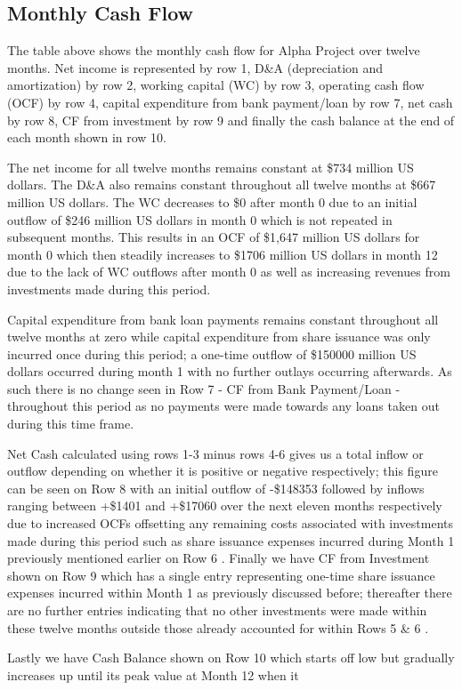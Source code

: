 

\subsection{Monthly Cash Flow}\label{sec:title}

The table above shows the monthly cash flow for Alpha Project over twelve months. Net income is represented by row 1, D&A (depreciation and amortization) by row 2, working capital (WC) by row 3, operating cash flow (OCF) by row 4, capital expenditure from bank payment/loan by row 7, net cash by row 8, CF from investment by row 9 and finally the cash balance at the end of each month shown in row 10.  

The net income for all twelve months remains constant at \$734 million US dollars. The D&A also remains constant throughout all twelve months at \$667 million US dollars. The WC decreases to \$0 after month 0 due to an initial outflow of \$246 million US dollars in month 0 which is not repeated in subsequent months. This results in an OCF of \$1,647 million US dollars for month 0 which then steadily increases to \$1706 million US dollars in month 12 due to the lack of WC outflows after month 0 as well as increasing revenues from investments made during this period. 

Capital expenditure from bank loan payments remains constant throughout all twelve months at zero while capital expenditure from share issuance was only incurred once during this period; a one-time outflow of \$150000 million US dollars occurred during month 1 with no further outlays occurring afterwards. As such there is no change seen in Row 7 - CF from Bank Payment/Loan - throughout this period as no payments were made towards any loans taken out during this time frame. 

Net Cash calculated using rows 1-3 minus rows 4-6 gives us a total inflow or outflow depending on whether it is positive or negative respectively; this figure can be seen on Row 8 with an initial outflow of -\$148353 followed by inflows ranging between +\$1401 and +\$17060 over the next eleven months respectively due to increased OCFs offsetting any remaining costs associated with investments made during this period such as share issuance expenses incurred during Month 1 previously mentioned earlier on Row 6 . Finally we have CF from Investment shown on Row 9 which has a single entry representing one-time share issuance expenses incurred within Month 1 as previously discussed before; thereafter there are no further entries indicating that no other investments were made within these twelve months outside those already accounted for within Rows 5 & 6 . 

 Lastly we have Cash Balance shown on Row 10 which starts off low but gradually increases up until its peak value at Month 12 when it